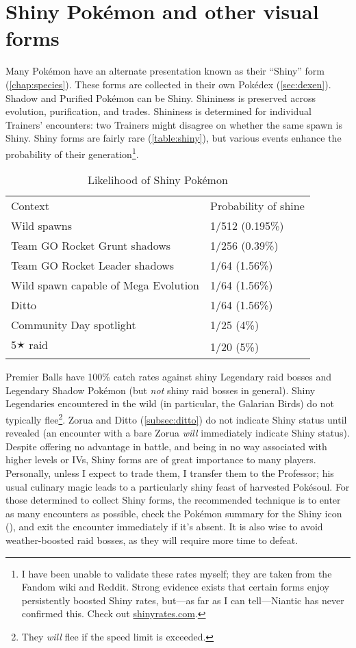 \section{Shiny Pokémon and other visual forms\label{sec:shiny}}
Many Pokémon have an alternate presentation known as their ``Shiny'' form (\autoref{chap:species}).
These forms are collected in their own Pokédex (\autoref{sec:dexen}).
Shadow and Purified Pokémon can be Shiny.
Shininess is preserved across evolution, purification, and trades.
Shininess is determined for individual Trainers' encounters: two Trainers might disagree on whether the same spawn is Shiny.
Shiny forms are fairly rare (\autoref{table:shiny}), but various events
  enhance the probability of their generation\footnote{I have been unable to validate these rates myself; they are taken from the Fandom wiki and Reddit.
  Strong evidence exists that certain forms enjoy persistently boosted Shiny rates, but---as far as I can tell---Niantic
  has never confirmed this. Check out \href{https://shinyrates.com}{shinyrates.com}.}.
\begin{table}
\centering
\begin{tabular}{ll}
Context & Probability of shine \\
\Midrule
  Wild spawns & 1/512 (0.195\%) \\
  Team GO Rocket Grunt shadows & 1/256 (0.39\%) \\
  Team GO Rocket Leader shadows & 1/64 (1.56\%) \\
  Wild spawn capable of Mega Evolution & 1/64 (1.56\%)\\
  Ditto & 1/64 (1.56\%)\\
  Community Day spotlight & 1/25 (4\%)\\
  5🟉 raid & 1/20 (5\%) \\
\end{tabular}
  \caption{Likelihood of Shiny Pokémon\label{table:shiny}}
\end{table}
Premier Balls have 100\% catch rates against shiny Legendary raid bosses and Legendary Shadow Pokémon (but \textit{not} shiny raid bosses in general).
Shiny Legendaries encountered in the wild (in particular, the Galarian Birds) do not typically flee\footnote{They \textit{will} flee if the speed limit is exceeded.}.
Zorua and Ditto (\autoref{subsec:ditto}) do not indicate Shiny status until revealed (an encounter
  with a bare Zorua \textit{will} immediately indicate Shiny status).
Despite offering no advantage in battle, and being in no way associated with
  higher levels or IVs, Shiny forms are of great importance to many players.
Personally, unless I expect to trade them, I transfer them to the Professor;
his usual culinary magic leads to a particularly shiny feast of harvested Pokésoul.
For those determined to collect Shiny forms, the recommended technique
  is to enter as many encounters as possible, check the Pokémon summary
  for the Shiny icon (),
  and exit the encounter immediately if it's absent.
It is also wise to avoid weather-boosted raid bosses, as they will
 require more time to defeat.

